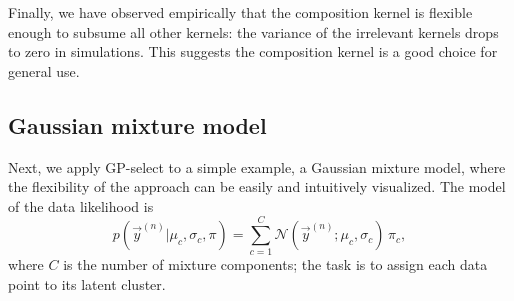 
Finally, we have observed empirically that the composition kernel is flexible enough to subsume all other kernels:
the variance of the irrelevant kernels drops to zero in simulations.
This suggests the composition kernel is a good choice  for general use. 


\subsection{Gaussian mixture model}
%
Next, we apply GP-select to a simple example, a Gaussian mixture model, where the flexibility of the approach can be easily and intuitively visualized.
The model of the data likelihood is
%
\vspace{-.2cm}
\begin{equation}\label{eq:mog}
p(\vec{y}^{(n)} | \mu_c, \sigma_c, \pi) = \sum_{c=1}^{C} \mathcal{N}(\vec{y}^{(n)}; \mu_c, \sigma_c) \, \pi_c,
\end{equation}
%
where $C$ is the number of mixture components; the task is to assign each data point to its latent cluster.
%

